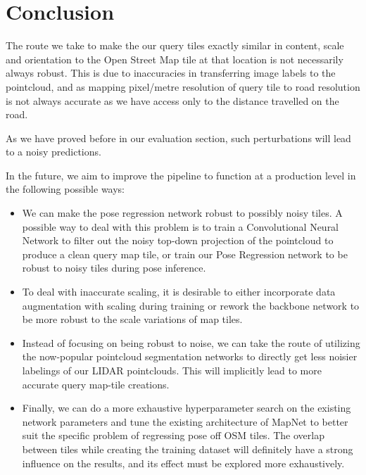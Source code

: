 \chapter{Conclusion}
The route we take to make the our query tiles exactly similar in content, scale and orientation to the Open Street Map tile at that location is not necessarily always robust. This is due to inaccuracies in transferring image labels to the pointcloud, and as mapping pixel/metre resolution of query tile to road resolution is not always accurate as we have access only to the distance travelled on the road.
	
As we have proved before in our evaluation section, such perturbations will lead to a noisy predictions. 

In the future, we aim to improve the pipeline to function at a production level in the following possible ways:

\begin{itemize}
\item We can make the pose regression network robust to possibly noisy tiles. A possible way to deal with this problem is to train a Convolutional Neural Network to filter out the noisy top-down projection of the pointcloud to produce a clean query map tile, or train our Pose Regression network to be robust to noisy tiles during pose inference.
\\
\item To deal with inaccurate scaling, it is desirable to either incorporate data augmentation with scaling during training or rework the backbone network to be more robust to the scale variations of map tiles. 
\\
\item Instead of focusing on being robust to noise, we can take the route of utilizing the now-popular pointcloud segmentation networks to directly get less noisier labelings of our LIDAR pointclouds. This will implicitly lead to more accurate query map-tile creations.
\\
\item Finally, we can do a more exhaustive hyperparameter search on the existing network parameters and tune the existing architecture of MapNet to better suit the specific problem of regressing pose off OSM tiles. The overlap between tiles while creating the training dataset will definitely have a strong influence on the results, and its effect must be explored more exhaustively. 
\end{itemize}

